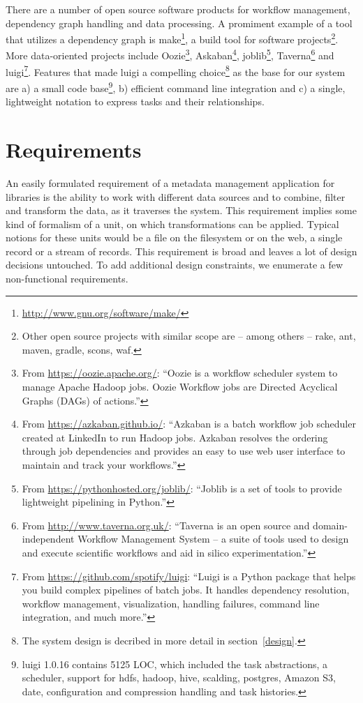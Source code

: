 \documentclass[english]{lni}
\begin{document}
There are a number of open source software products for workflow
management, dependency graph handling and data processing.
A promiment example of a tool that utilizes a dependency graph is make\footnote{\url{http://www.gnu.org/software/make/}}, a build tool for software projects\footnote{Other open source projects with similar scope are -- among others -- rake, ant, maven, gradle, scons, waf.}.
More data-oriented projects include
Oozie\footnote{From \url{https://oozie.apache.org/}: ``Oozie is a workflow scheduler system to manage Apache Hadoop jobs.
Oozie Workflow jobs are Directed Acyclical Graphs (DAGs) of actions.''},
Askaban\footnote{From \url{https://azkaban.github.io/}: ``Azkaban is a batch workflow job scheduler created at LinkedIn to run Hadoop jobs. Azkaban resolves the ordering through job dependencies and provides an easy to use web user interface to maintain and track your workflows.''}, joblib\footnote{From \url{https://pythonhosted.org/joblib/}: ``Joblib is a set of tools to provide lightweight pipelining in Python.''}, Taverna\footnote{From \url{http://www.taverna.org.uk/}: ``Taverna is an open source and domain-independent Workflow Management System -- a suite of tools used to design and execute scientific workflows and aid in silico experimentation.''} and luigi\footnote{From \url{https://github.com/spotify/luigi}: ``Luigi is a Python package that helps you build complex pipelines of batch jobs. It handles dependency resolution, workflow management, visualization, handling failures, command line integration, and much more.''}.
Features that made luigi a compelling choice\footnote{The system design is decribed in more detail in section~\ref{design}.} as the base
for our system are a) a small code base\footnote{luigi 1.0.16 contains 5125 LOC, which included the task abstractions, a scheduler, support for hdfs, hadoop, hive, scalding, postgres, Amazon S3, date, configuration and compression handling and task histories.}, b) efficient command line integration and c) a single, lightweight notation to express tasks and their relationships.

\section{Requirements}
\label{requirements}

An easily formulated requirement of a metadata management application
for libraries is the ability to work with different data sources and to
combine, filter and transform the data, as it traverses the system. This requirement
implies some kind of formalism of a unit, on which transformations can be applied.
Typical notions for these units would be a file on the filesystem or on the web, a single
record or a stream of records. This requirement is broad and leaves a lot of design decisions untouched. To add additional design constraints, we enumerate a few non-functional requirements.
\end{document}
